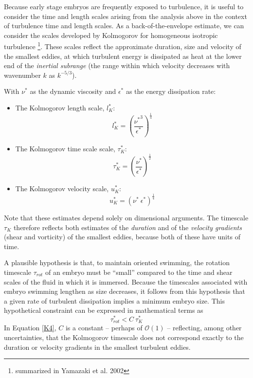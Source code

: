 \documentclass[10pt,a4paper]{article}
\begin{document}
Because early stage embryos are frequently exposed to turbulence, it is useful to consider the time and length scales arising from the analysis above in the context of turbulence time and length scales.
As a back-of-the-envelope estimate, we can consider the scales developed by Kolmogorov for homogeneous isotropic turbulence \footnote{summarized in Yamazaki et al. 2002}.
These scales reflect the approximate duration, size and velocity of the smallest eddies, at which turbulent energy is dissipated as heat at the lower end of the \textit{inertial subrange} (the range within which velocity decreases with wavenumber $k$ as $k^{-5/3}$).

With $\nu^*$ as the dynamic viscosity and $\epsilon^*$ as the energy dissipation rate:
\begin{itemize}
	\item The Kolmogorov length scale, $l_K^*$:
	\begin{equation}\label{K1}
		l_K^* = \left(\frac{{\nu^*}^3}{\epsilon^*}\right)^\frac{1}{4}
	\end{equation}
	\item The Kolmogorov time scale scale, $\tau_K^*$:
	\begin{equation}\label{K2}
		\tau_K^* = \left(\frac{\nu^*}{\epsilon^*}\right)^\frac{1}{2}
	\end{equation}
	\item The Kolmogorov velocity scale, $u_K^*$:
	\begin{equation}\label{K3}
		u_K^* = \left(\nu^* ~ \epsilon^* \right)^\frac{1}{4}
	\end{equation}
\end{itemize}
Note that these estimates depend solely on dimensional arguments.
The timescale $\tau_K$ therefore reflects both estimates of the \textit{duration} and of the \textit{velocity gradients} (shear and vorticity) of the smallest eddies, because both of these have units of time.

A plausible hypothesis is that, to maintain oriented swimming, the rotation timescale $\tau_{rot}$ of an embryo must be ``small'' compared to the time and shear scales of the fluid in which it is immersed. 
Because the timescales associated with embryo swimming lengthen as size decreases, it follows from this hypothesis that a given rate of turbulent dissipation implies a minimum embryo size.
This hypothetical constraint can be expressed in mathematical terms as
\begin{equation}\label{K4}
	\tau_{rot}^* < C ~ \tau_K^*
\end{equation}
In Equation \ref{K4}, $C$ is a constant -- perhaps of $\mathcal{O}(1)$ -- reflecting, among other uncertainties, that the Kolmogorov timescale does not correspond exactly to the duration or velocity gradients in the smallest turbulent eddies. 
\end{document}
